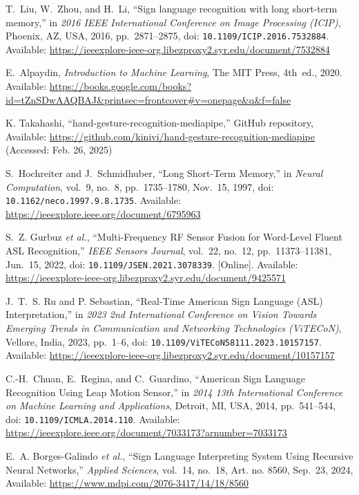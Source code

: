 \documentclass[12pt]{article}
\begin{document}
\begin{thebibliography}{99}
T.~Liu, W.~Zhou, and H.~Li, 
“Sign language recognition with long short-term memory,” 
in \emph{2016 IEEE International Conference on Image Processing (ICIP)}, 
Phoenix, AZ, USA, 2016, pp.~2871--2875, 
doi: \texttt{10.1109/ICIP.2016.7532884}.  
Available: \url{https://ieeexplore-ieee-org.libezproxy2.syr.edu/document/7532884}

E.~Alpaydin, 
\emph{Introduction to Machine Learning}, 
The MIT Press, 4th~ed., 2020.  
Available: \url{https://books.google.com/books?id=tZnSDwAAQBAJ&printsec=frontcover#v=onepage&q&f=false}

K. Takahashi, “hand-gesture-recognition-mediapipe,” GitHub repository,  
Available: \url{https://github.com/kinivi/hand-gesture-recognition-mediapipe} (Accessed: Feb. 26, 2025)

S.~Hochreiter and J.~Schmidhuber, 
“Long Short-Term Memory,” 
in \emph{Neural Computation}, vol.~9, no.~8, pp.~1735--1780, Nov.~15, 1997, 
doi: \texttt{10.1162/neco.1997.9.8.1735}. 
Available: \url{https://ieeexplore.ieee.org/document/6795963}

S.~Z. Gurbuz \emph{et al.}, 
“Multi-Frequency RF Sensor Fusion for Word-Level Fluent ASL Recognition,” 
\emph{IEEE Sensors Journal}, vol.~22, no.~12, pp.~11373--11381, Jun.~15, 2022, 
doi: \texttt{10.1109/JSEN.2021.3078339}. [Online].  
Available: \url{https://ieeexplore-ieee-org.libezproxy2.syr.edu/document/9425571}

J.~T.~S. Ru and P. Sebastian, 
“Real-Time American Sign Language (ASL) Interpretation,” 
in \emph{2023 2nd International Conference on Vision Towards Emerging Trends in Communication and Networking Technologies (ViTECoN)}, 
Vellore, India, 2023, pp.~1--6, 
doi: \texttt{10.1109/ViTECoN58111.2023.10157157}. 
Available: \url{https://ieeexplore-ieee-org.libezproxy2.syr.edu/document/10157157}

C.-H.~Chuan, E.~Regina, and C.~Guardino, 
“American Sign Language Recognition Using Leap Motion Sensor,” 
in \emph{2014 13th International Conference on Machine Learning and Applications}, 
Detroit, MI, USA, 2014, pp.~541–544, 
doi: \texttt{10.1109/ICMLA.2014.110}. 
Available: \url{https://ieeexplore.ieee.org/document/7033173?arnumber=7033173}

E.~A. Borges-Galindo \emph{et al.}, 
“Sign Language Interpreting System Using Recursive Neural Networks,” 
\emph{Applied Sciences}, vol.~14, no.~18, Art. no. 8560, Sep.~23, 2024,  
Available: \url{https://www.mdpi.com/2076-3417/14/18/8560}


\end{thebibliography}
\end{document}
